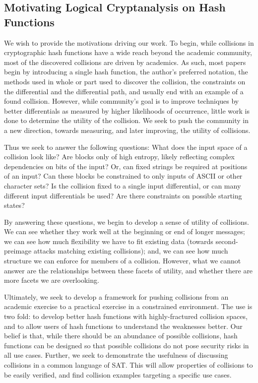 \documentclass[letterpaper,twocolumn,10pt]{article}
\begin{document}
\subsection{Motivating Logical Cryptanalysis on Hash Functions}

We wish to provide the motivations driving our work. To begin, while collisions
in cryptographic hash functions have a wide reach beyond the academic community,
most of the discovered collisions are driven by academics. As such, most papers
begin by introducing a single hash function, the author's preferred notation,
the methods used in whole or part used to discover the collision, the constraints
on the differential and the differential path, and usually end with an example of a
found collision. However, while community's goal is to improve techniques by
better differentials as measured by higher likelihoods of occurrence, little work
is done to determine the utility of the collision. We seek to push the
community in a new direction, towards measuring, and later improving, the utility
of collisions.

Thus we seek to answer the following questions: What does the input space of
a collision look like? Are blocks only of high entropy, likely reflecting
complex dependencies on bits of the input? Or, can fixed strings be required at
positions of an input? Can these blocks be constrained to only inputs of ASCII
or other character sets? Is the collision fixed to a single input differential,
or can many different input differentials be used? Are there constraints on
possible starting states?

By answering these questions, we begin to develop a sense of utility of
collisions. We can see whether they work well at the beginning or end of
longer messages; we can see how much flexibility we have to fit existing
data (towards second-preimage attacks matching existing collisions); and, we
can see how much structure we can enforce for members of a collision. However,
what we cannot answer are the relationships between these facets of utility,
and whether there are more facets we are overlooking.

Ultimately, we seek to develop a framework for pushing collisions from an
academic exercise to a practical exercise in a constrained environment. The
use is two fold: to develop better hash functions with highly-fractured collision
spaces, and to allow users of hash functions to understand the weaknesses
better. Our belief is that, while there should be an abundance of possible
collisions, hash functions can be designed so that possible collisions do not
pose security risks in all use cases. Further, we seek to demonstrate the
usefulness of discussing collisions in a common language of SAT. This will
allow properties of collisions to be easily verified, and find collision
examples targeting a specific use cases.
\end{document}

